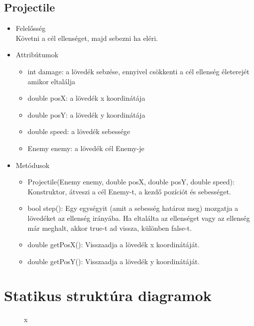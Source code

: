 \subsection{Projectile}
\begin{itemize}
\item Felelősség\\
Követni a cél ellenséget, majd sebezni ha eléri.
\item Attribútumok
	\begin{itemize}
		\item int damage: a lövedék sebzése, ennyivel csökkenti a cél ellenség életerejét amikor eltalálja
		\item double posX: a lövedék x koordinátája
		\item double posY: a lövedék y koordinátája
		\item double speed: a lövedék sebessége
		\item Enemy enemy: a lövedék cél Enemy-je
	\end{itemize}
\item Metódusok
	\begin{itemize}
		\item Projectile(Enemy enemy, double posX, double posY, double speed): Konstruktor, átveszi a cél Enemy-t, a kezdő pozíciót és sebességet.
		\item bool step(): Egy egységyit (amit a sebesség határoz meg) mozgatja a lövedéket az ellenség irányába. Ha eltalálta az ellenséget vagy az ellenség már meghalt, akkor true-t ad vissza, különben false-t.
		\item double getPosX(): Visszaadja a lövedék x koordinátáját.
		\item double getPosY(): Visszaadja a lövedék y koordinátáját.
	\end{itemize}
\end{itemize}

\section{Statikus struktúra diagramok}

\begin{figure}[h]
\begin{center}
\caption{x}
\label{fig:example1}
\end{center}
\end{figure}

